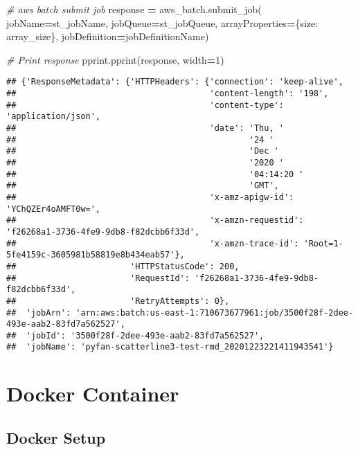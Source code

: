 \documentclass[
]{book}
\newenvironment{Shaded}{\begin{snugshade}}{\end{snugshade}}
\newcommand{\CommentTok}[1]{\textcolor[rgb]{0.56,0.35,0.01}{\textit{#1}}}
\newcommand{\DecValTok}[1]{\textcolor[rgb]{0.00,0.00,0.81}{#1}}
\newcommand{\NormalTok}[1]{#1}
\newcommand{\OperatorTok}[1]{\textcolor[rgb]{0.81,0.36,0.00}{\textbf{#1}}}
\newcommand{\StringTok}[1]{\textcolor[rgb]{0.31,0.60,0.02}{#1}}
\begin{document}
\begin{Shaded}
\begin{Highlighting}[]
\CommentTok{\# aws batch submit job}
\NormalTok{response }\OperatorTok{=}\NormalTok{ aws\_batch.submit\_job(}
\NormalTok{    jobName}\OperatorTok{=}\NormalTok{st\_jobName,}
\NormalTok{    jobQueue}\OperatorTok{=}\NormalTok{st\_jobQueue,}
\NormalTok{    arrayProperties}\OperatorTok{=}\NormalTok{\{}\StringTok{\textquotesingle{}size\textquotesingle{}}\NormalTok{: array\_size\},}
\NormalTok{    jobDefinition}\OperatorTok{=}\NormalTok{jobDefinitionName)}

\CommentTok{\# Print response}
\NormalTok{pprint.pprint(response, width}\OperatorTok{=}\DecValTok{1}\NormalTok{)}
\end{Highlighting}
\end{Shaded}

\begin{verbatim}
## {'ResponseMetadata': {'HTTPHeaders': {'connection': 'keep-alive',
##                                       'content-length': '198',
##                                       'content-type': 'application/json',
##                                       'date': 'Thu, '
##                                               '24 '
##                                               'Dec '
##                                               '2020 '
##                                               '04:14:20 '
##                                               'GMT',
##                                       'x-amz-apigw-id': 'YChQZEr4oAMFT0w=',
##                                       'x-amzn-requestid': 'f26268a1-3736-4fe9-9db8-f82dcbb6f33d',
##                                       'x-amzn-trace-id': 'Root=1-5fe4159c-3605981b58819e8b434eab57'},
##                       'HTTPStatusCode': 200,
##                       'RequestId': 'f26268a1-3736-4fe9-9db8-f82dcbb6f33d',
##                       'RetryAttempts': 0},
##  'jobArn': 'arn:aws:batch:us-east-1:710673677961:job/3500f28f-2dee-493e-aab2-83fd7a562527',
##  'jobId': '3500f28f-2dee-493e-aab2-83fd7a562527',
##  'jobName': 'pyfan-scatterline3-test-rmd_20201223221411943541'}
\end{verbatim}

\hypertarget{docker-container}{%
\chapter{Docker Container}\label{docker-container}}

\hypertarget{docker-setup}{%
\section{Docker Setup}\label{docker-setup}}
\end{document}

